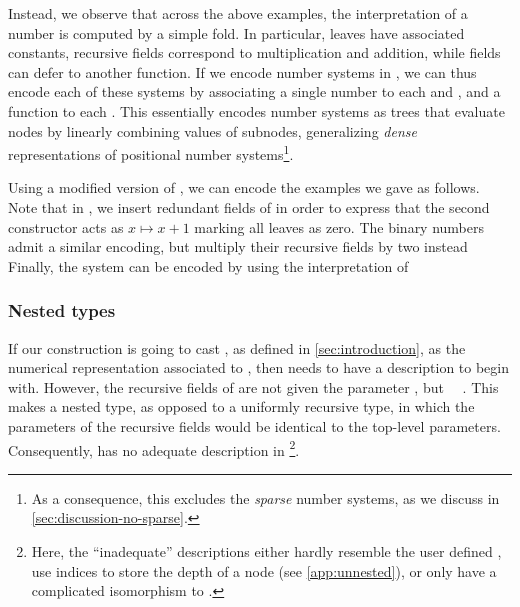 Instead, we observe that across the above examples, the interpretation of a number is computed by a simple fold. In particular, leaves have associated constants, recursive fields correspond to multiplication and addition, while fields can defer to another function. If we encode number systems in , we can thus encode each of these systems by associating a single number to each  and , and a function to each . This essentially encodes number systems as trees that evaluate nodes by linearly combining values of subnodes, generalizing \emph{dense} representations of positional number systems\footnote{As a consequence, this excludes the \emph{sparse} number systems, as we discuss in \autoref{sec:discussion-no-sparse}.}.

Using a modified version of , we can encode the examples we gave as follows. Note that in \bN{}, we insert redundant fields of  in order to express that the second constructor acts as $x \mapsto x + 1$
marking all leaves as zero. The binary numbers admit a similar encoding, but multiply their recursive fields by two instead
Finally, the  system can be encoded by using the interpretation of 


\subsubsection{Nested types}
If our construction is going to cast , as defined in \autoref{sec:introduction}, as the numerical representation associated to , then  needs to have a description to begin with. However, the recursive fields of  are not given the parameter , but \ \ . This makes  a nested type, as opposed to a uniformly recursive type, in which the parameters of the recursive fields would be identical to the top-level parameters. Consequently,  has no adequate description in \footnote{Here, the ``inadequate'' descriptions either hardly resemble the user defined , use indices to store the depth of a node (see \autoref{app:unnested}), or only have a complicated isomorphism to .}. 

